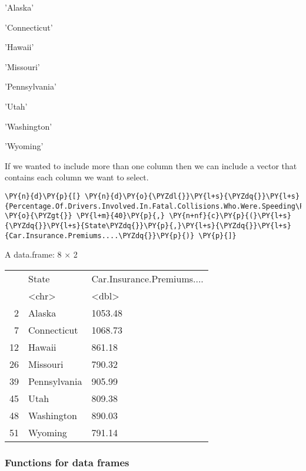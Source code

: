     \begin{enumerate*}
\item 'Alaska'
\item 'Connecticut'
\item 'Hawaii'
\item 'Missouri'
\item 'Pennsylvania'
\item 'Utah'
\item 'Washington'
\item 'Wyoming'
\end{enumerate*}


    
    If we wanted to include more than one column then we can include a
vector that contains each column we want to select.

    \begin{tcolorbox}[breakable, size=fbox, boxrule=1pt, pad at break*=1mm,colback=cellbackground, colframe=cellborder]
\begin{Verbatim}[commandchars=\\\{\}]
\PY{n}{d}\PY{p}{[} \PY{n}{d}\PY{o}{\PYZdl{}}\PY{l+s}{\PYZdq{}}\PY{l+s}{Percentage.Of.Drivers.Involved.In.Fatal.Collisions.Who.Were.Speeding\PYZdq{}} \PY{o}{\PYZgt{}} \PY{l+m}{40}\PY{p}{,} \PY{n+nf}{c}\PY{p}{(}\PY{l+s}{\PYZdq{}}\PY{l+s}{State\PYZdq{}}\PY{p}{,}\PY{l+s}{\PYZdq{}}\PY{l+s}{Car.Insurance.Premiums....\PYZdq{}}\PY{p}{)} \PY{p}{]}
\end{Verbatim}
\end{tcolorbox}

    A data.frame: 8 × 2
\begin{tabular}{r|ll}
  & State & Car.Insurance.Premiums....\\
  & <chr> & <dbl>\\
\hline
	2 & Alaska       & 1053.48\\
	7 & Connecticut  & 1068.73\\
	12 & Hawaii       &  861.18\\
	26 & Missouri     &  790.32\\
	39 & Pennsylvania &  905.99\\
	45 & Utah         &  809.38\\
	48 & Washington   &  890.03\\
	51 & Wyoming      &  791.14\\
\end{tabular}


    
    \hypertarget{functions-for-data-frames}{%
\subsubsection{Functions for data
frames}\label{functions-for-data-frames}}

